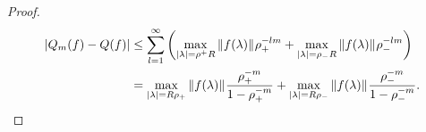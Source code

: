 \begin{proof}
    \begin{align*}
        |Q_m(f) - Q(f)|
        & \leq
        \sum_{l=1}^\infty
            {\left ( 
                \max_{|\lambda| = \rho^+R}
                    {\left \| f(\lambda) \right \|}_{}
                    \rho_+^{-l m}
                +
                \max_{|\lambda| = \rho_-R}
                    {\left \| f(\lambda) \right \|}_{}
                    \rho_-^{-l m}
             \right )} \\
        & =
        \max_{{\left | \lambda \right |} = R \rho_+}
            {\left \| f(\lambda) \right \|}_{}
        \frac{\rho_+^{-m}}{1 - \rho_+^{-m}}
        +
        \max_{{\left | \lambda \right |} = R \rho_-}
            {\left \| f(\lambda) \right \|}_{}
        \frac{\rho_-^{-m}}{1 - \rho_-^{-m}}.
    \end{align*}

\end{proof}
